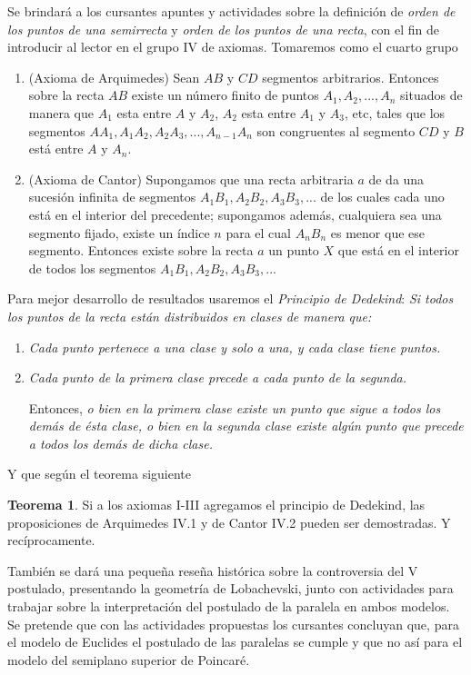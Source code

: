 \documentclass[oneside,spanish]{amsart}
\numberwithin{equation}{section}
\numberwithin{figure}{section}
\theoremstyle{definition}
\newtheorem*{thm*}{Teorema}
\begin{document}
Se brindará a los cursantes apuntes y actividades sobre la definición de \emph{orden de los puntos de una semirrecta} y \emph{orden de los puntos de una recta}, con el fin de introducir al lector en el grupo IV de axiomas. Tomaremos como el cuarto grupo
\begin{enumerate}[label=Ax IV.\arabic{enumi}]
	\item (Axioma de Arquimedes) Sean $AB$ y $CD$ segmentos arbitrarios. Entonces sobre la recta $AB$ existe un número finito de puntos $A_{1},A_{2},...,A_{n}$ situados de manera que $A_{1}$ esta entre $A$ y $A_{2}$, $A_{2}$ esta entre $A_{1}$ y $A_{3}$, etc, tales que los segmentos $AA_{1},A_{1}A_{2},A_{2}A_{3},...,A_{n-1}A_{n}$ son congruentes al segmento $CD$ y $B$ está entre $A$ y $A_{n}$.
	\item (Axioma de Cantor) Supongamos que una recta arbitraria $a$ de da una sucesión infinita de segmentos $A_{1}B_{1},A_{2}B_{2},A_{3}B_{3},...$ de los cuales cada uno está en el interior del precedente; supongamos además, cualquiera sea una segmento fijado, existe un índice $n$ para el cual $A_{n}B_{n}$ es menor que ese segmento. Entonces existe sobre la recta $a$ un punto $X$ que está en el interior de todos los segmentos $A_{1}B_{1},A_{2}B_{2},A_{3}B_{3},...$
\end{enumerate}

Para mejor desarrollo de resultados usaremos el \emph{Principio de Dedekind}: \emph{Si todos los puntos de la recta están distribuidos
en clases de manera que:}
\begin{enumerate}
	\item \emph{Cada punto pertenece a una clase y solo a una, y cada clase tiene puntos.}
	\item \emph{Cada punto de la primera clase precede a cada punto de la segunda.}
	
	Entonces,\emph{ o bien en la primera clase existe un punto que sigue a todos los demás de ésta clase, o bien en la segunda clase existe algún punto que precede a todos los demás de dicha clase.}
\end{enumerate}

Y que según el teorema siguiente
\begin{thm*}
Si a los axiomas I-III agregamos el principio de Dedekind, las proposiciones de Arquimedes IV.1 y de Cantor IV.2 pueden ser demostradas. Y recíprocamente.
\end{thm*}

También se dará una pequeña reseña histórica sobre la controversia del V postulado, presentando la geometría de Lobachevski, junto con actividades para trabajar sobre la interpretación del postulado de la paralela en ambos modelos. Se pretende que con las actividades propuestas los cursantes concluyan que, para el modelo de Euclides el postulado de las paralelas se cumple y que no así para el modelo del semiplano superior de Poincaré.
\end{document}
